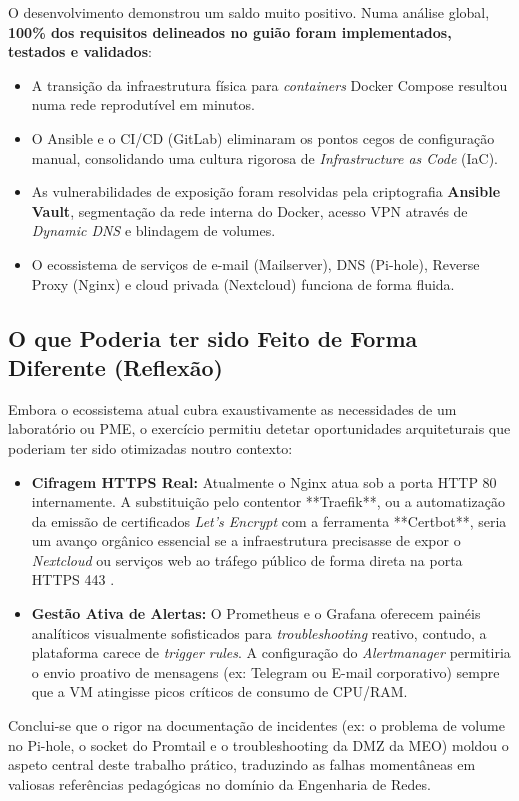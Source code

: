 O desenvolvimento demonstrou um saldo muito positivo. Numa análise global, \textbf{100\% dos requisitos delineados no guião foram implementados, testados e validados}:
\begin{itemize}
    \item A transição da infraestrutura física para \textit{containers} Docker Compose resultou numa rede reprodutível em minutos.
    \item O Ansible e o CI/CD (GitLab) eliminaram os pontos cegos de configuração manual, consolidando uma cultura rigorosa de \textit{Infrastructure as Code} (IaC).
    \item As vulnerabilidades de exposição foram resolvidas pela criptografia \textbf{Ansible Vault}, segmentação da rede interna do Docker, acesso VPN através de \textit{Dynamic DNS} e blindagem de volumes.
    \item O ecossistema de serviços de e-mail (Mailserver), DNS (Pi-hole), Reverse Proxy (Nginx) e cloud privada (Nextcloud) funciona de forma fluida.
\end{itemize}

\subsection{O que Poderia ter sido Feito de Forma Diferente (Reflexão)}

Embora o ecossistema atual cubra exaustivamente as necessidades de um laboratório ou PME, o exercício permitiu detetar oportunidades arquiteturais que poderiam ter sido otimizadas noutro contexto:
\begin{itemize}
    \item \textbf{Cifragem HTTPS Real:} Atualmente o Nginx atua sob a porta HTTP 80 internamente. A substituição pelo contentor **Traefik**, ou a automatização da emissão de certificados \textit{Let's Encrypt} com a ferramenta **Certbot**, seria um avanço orgânico essencial se a infraestrutura precisasse de expor o \textit{Nextcloud} ou serviços web ao tráfego público de forma direta na porta HTTPS 443 \cite{rfc8446}.
    \item \textbf{Gestão Ativa de Alertas:} O Prometheus e o Grafana oferecem painéis analíticos visualmente sofisticados para \textit{troubleshooting} reativo, contudo, a plataforma carece de \textit{trigger rules}. A configuração do \textit{Alertmanager} permitiria o envio proativo de mensagens (ex: Telegram ou E-mail corporativo) sempre que a VM atingisse picos críticos de consumo de CPU/RAM.
\end{itemize}

Conclui-se que o rigor na documentação de incidentes (ex: o problema de volume no Pi-hole, o socket do Promtail e o troubleshooting da DMZ da MEO) moldou o aspeto central deste trabalho prático, traduzindo as falhas momentâneas em valiosas referências pedagógicas no domínio da Engenharia de Redes.